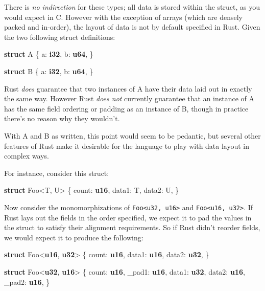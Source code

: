 \documentclass[a4paper,]{book}
\newenvironment{Shaded}{\begin{snugshade}}{\end{snugshade}}
\newcommand{\KeywordTok}[1]{\textcolor[rgb]{0.13,0.29,0.53}{\textbf{{#1}}}}
\newcommand{\NormalTok}[1]{{#1}}
\begin{document}
There is \emph{no indirection} for these types; all data is stored
within the struct, as you would expect in C. However with the exception
of arrays (which are densely packed and in-order), the layout of data is
not by default specified in Rust. Given the two following struct
definitions:

\begin{Shaded}
\begin{Highlighting}[]
\KeywordTok{struct} \NormalTok{A \{}
    \NormalTok{a: }\KeywordTok{i32}\NormalTok{,}
    \NormalTok{b: }\KeywordTok{u64}\NormalTok{,}
\NormalTok{\}}

\KeywordTok{struct} \NormalTok{B \{}
    \NormalTok{a: }\KeywordTok{i32}\NormalTok{,}
    \NormalTok{b: }\KeywordTok{u64}\NormalTok{,}
\NormalTok{\}}
\end{Highlighting}
\end{Shaded}

Rust \emph{does} guarantee that two instances of A have their data laid
out in exactly the same way. However Rust \emph{does not} currently
guarantee that an instance of A has the same field ordering or padding
as an instance of B, though in practice there's no reason why they
wouldn't.

With A and B as written, this point would seem to be pedantic, but
several other features of Rust make it desirable for the language to
play with data layout in complex ways.

For instance, consider this struct:

\begin{Shaded}
\begin{Highlighting}[]
\KeywordTok{struct} \NormalTok{Foo<T, U> \{}
    \NormalTok{count: }\KeywordTok{u16}\NormalTok{,}
    \NormalTok{data1: T,}
    \NormalTok{data2: U,}
\NormalTok{\}}
\end{Highlighting}
\end{Shaded}

Now consider the monomorphizations of
\texttt{Foo\textless{}u32,\ u16\textgreater{}} and
\texttt{Foo\textless{}u16,\ u32\textgreater{}}. If Rust lays out the
fields in the order specified, we expect it to pad the values in the
struct to satisfy their alignment requirements. So if Rust didn't
reorder fields, we would expect it to produce the following:

\begin{Shaded}
\begin{Highlighting}[]
\KeywordTok{struct} \NormalTok{Foo<}\KeywordTok{u16}\NormalTok{, }\KeywordTok{u32}\NormalTok{> \{}
    \NormalTok{count: }\KeywordTok{u16}\NormalTok{,}
    \NormalTok{data1: }\KeywordTok{u16}\NormalTok{,}
    \NormalTok{data2: }\KeywordTok{u32}\NormalTok{,}
\NormalTok{\}}

\KeywordTok{struct} \NormalTok{Foo<}\KeywordTok{u32}\NormalTok{, }\KeywordTok{u16}\NormalTok{> \{}
    \NormalTok{count: }\KeywordTok{u16}\NormalTok{,}
    \NormalTok{_pad1: }\KeywordTok{u16}\NormalTok{,}
    \NormalTok{data1: }\KeywordTok{u32}\NormalTok{,}
    \NormalTok{data2: }\KeywordTok{u16}\NormalTok{,}
    \NormalTok{_pad2: }\KeywordTok{u16}\NormalTok{,}
\NormalTok{\}}
\end{Highlighting}
\end{Shaded}
\end{document}
